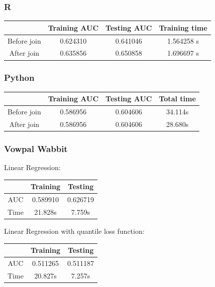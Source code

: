 \documentclass[10pt]{article}
\begin{document}
\subsubsection{R}
\begin{center}
 \begin{tabular}{|c | c | c | c||} 
 \hline
 & Training AUC & Testing AUC & Training time\\ [0.5ex] 
 \hline\hline
Before join & 0.624310 & 0.641046 & 1.564258 s\\
 \hline
After join & 0.635856 & 0.650858 & 1.696697 s\\ 
 \hline
\end{tabular}
\end{center}

\subsubsection{Python}
\begin{center}
 \begin{tabular}{|c | c | c | c||} 
 \hline
 & Training AUC & Testing AUC & Total time\\ [0.5ex] 
 \hline\hline
Before join & 0.586956 & 0.604606 & 34.114s\\
 \hline
After join & 0.586956 & 0.604606 & 28.680s\\ 
 \hline
\end{tabular}
\end{center}

\subsubsection{Vowpal Wabbit}

Linear Regression:\\

\begin{center}
 \begin{tabular}{|c | c | c||} 
 \hline
 & Training & Testing\\ [0.5ex] 
 \hline\hline
AUC & 0.589910 & 0.626719\\ 
 \hline
Time & 21.828s & 7.759s\\ 
 \hline
\end{tabular}
\end{center}

Linear Regression with quantile loss function:\\

\begin{center}
 \begin{tabular}{|c | c | c||} 
 \hline
 & Training & Testing\\ [0.5ex] 
 \hline\hline
AUC & 0.511265 & 0.511187\\ 
 \hline
Time & 20.827s & 7.257s\\ 
 \hline
\end{tabular}
\end{center}
\end{document}
